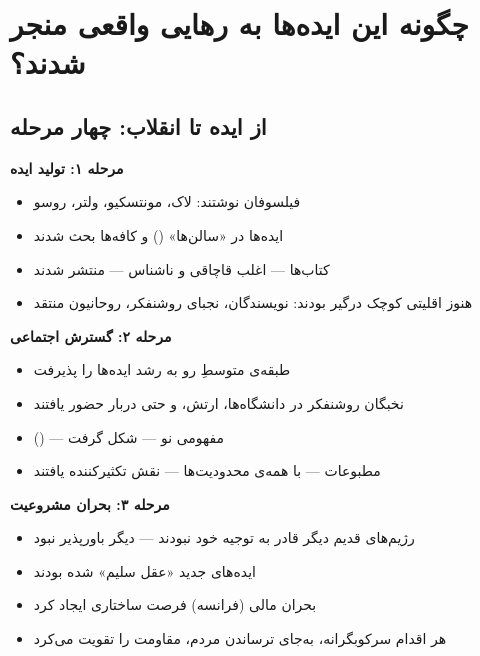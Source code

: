 \section{چگونه این ایده‌ها به رهایی واقعی منجر شدند؟}
\label{sec:ch16-ideas-to-revolution}

\subsection{از ایده تا انقلاب: چهار مرحله}

\begin{tcolorbox}[casebox, title={فرایند تبدیل ایده به تغییر سیاسی}]

\textbf{مرحله ۱: تولید ایده }
\begin{itemize}
\item فیلسوفان نوشتند: لاک، مونتسکیو، ولتر، روسو
\item ایده‌ها در «سالن‌ها» () و کافه‌ها بحث شدند
\item کتاب‌ها — اغلب قاچاقی و ناشناس — منتشر شدند
\item هنوز اقلیتی کوچک درگیر بودند: نویسندگان، نجبای روشنفکر، روحانیون
  منتقد
\end{itemize}

\tcblower

\textbf{مرحله ۲: گسترش اجتماعی }
\begin{itemize}
\item طبقه‌ی متوسطِ رو به رشد ایده‌ها را پذیرفت
\item نخبگان روشنفکر در دانشگاه‌ها، ارتش، و حتی دربار حضور یافتند
\item {} () — مفهومی نو — شکل
  گرفت
\item مطبوعات — با همه‌ی محدودیت‌ها — نقش تکثیرکننده یافتند
\end{itemize}

\tcblower

\textbf{مرحله ۳: بحران مشروعیت }
\begin{itemize}
\item رژیم‌های قدیم دیگر قادر به توجیه خود نبودند —
   دیگر باورپذیر نبود
\item ایده‌های جدید «عقل سلیم» شده بودند
\item بحران مالی (فرانسه) فرصت ساختاری ایجاد کرد
\item هر اقدام سرکوبگرانه، به‌جای ترساندن مردم، مقاومت را تقویت می‌کرد
\end{itemize}


\end{tcolorbox}
